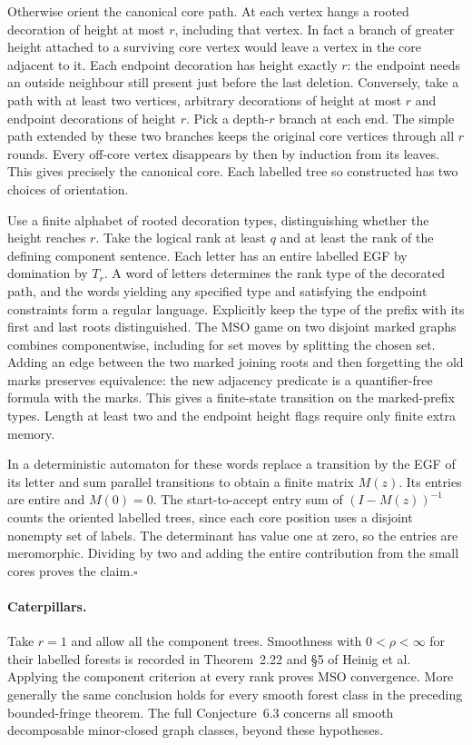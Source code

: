\documentclass[11pt]{article}
\begin{document}
Otherwise orient the canonical core path. At each vertex hangs a rooted decoration of height at most $r$, including that vertex. In fact a branch of greater height attached to a surviving core vertex would leave a vertex in the core adjacent to it. Each endpoint decoration has height exactly $r$: the endpoint needs an outside neighbour still present just before the last deletion. Conversely, take a path with at least two vertices, arbitrary decorations of height at most $r$ and endpoint decorations of height $r$. Pick a depth-$r$ branch at each end. The simple path extended by these two branches keeps the original core vertices through all $r$ rounds. Every off-core vertex disappears by then by induction from its leaves. This gives precisely the canonical core. Each labelled tree so constructed has two choices of orientation.

Use a finite alphabet of rooted decoration types, distinguishing whether the height reaches $r$. Take the logical rank at least $q$ and at least the rank of the defining component sentence. Each letter has an entire labelled EGF by domination by $T_r$. A word of letters determines the rank type of the decorated path, and the words yielding any specified type and satisfying the endpoint constraints form a regular language. Explicitly keep the type of the prefix with its first and last roots distinguished. The MSO game on two disjoint marked graphs combines componentwise, including for set moves by splitting the chosen set. Adding an edge between the two marked joining roots and then forgetting the old marks preserves equivalence: the new adjacency predicate is a quantifier-free formula with the marks. This gives a finite-state transition on the marked-prefix types. Length at least two and the endpoint height flags require only finite extra memory.

In a deterministic automaton for these words replace a transition by the EGF of its letter and sum parallel transitions to obtain a finite matrix $M(z)$. Its entries are entire and $M(0)=0$. The start-to-accept entry sum of $(I-M(z))^{-1}$ counts the oriented labelled trees, since each core position uses a disjoint nonempty set of labels. The determinant has value one at zero, so the entries are meromorphic. Dividing by two and adding the entire contribution from the small cores proves the claim.\hfill$\square$

\paragraph{Caterpillars.} Take $r=1$ and allow all the component trees. Smoothness with $0<\rho<\infty$ for their labelled forests is recorded in Theorem~2.22 and §5 of Heinig et al. Applying the component criterion at every rank proves MSO convergence. More generally the same conclusion holds for every smooth forest class in the preceding bounded-fringe theorem. The full Conjecture~6.3 concerns all smooth decomposable minor-closed graph classes, beyond these hypotheses.
\end{document}
